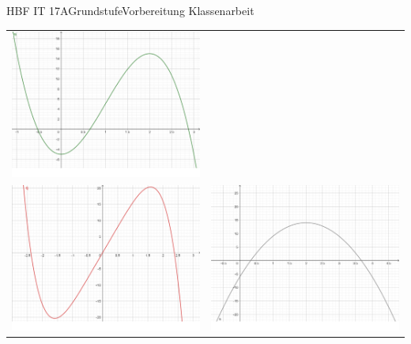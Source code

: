 \documentclass[oneside,openany,headings=optiontotoc,11pt,numbers=noenddot]{scrreprt}
\begin{document}
\begin{worksheet}{HBF IT 17A}{Grundstufe}{Vorbereitung Klassenarbeit}
\begin{framed}
\begin{tabularx}{\textwidth}{X|X}
				\includegraphics[scale=0.25]{Bilder/KAUebungBilder/m0.png}\\
				\includegraphics[scale=0.25]{Bilder/KAUebungBilder/q0.png} & \includegraphics[scale=0.25]{Bilder/KAUebungBilder/s0.png}\\

\end{tabularx}
\end{framed}
\end{worksheet}
\end{document}
